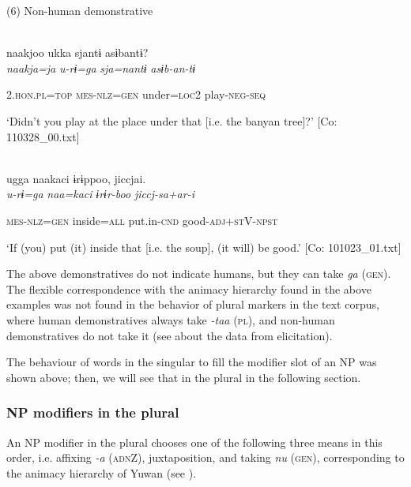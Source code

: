 (6)  Non-human demonstrative

 \ea{}\\
\gll  {\TM}  naakjoo  ukka  sjantɨ  asɨbantɨ?\\

      \textit{naakja=ja}  \textit{u-rɨ=ga}  \textit{sja=nantɨ}  \textit{asɨb-an-tɨ}

      2.\textsc{hon}.\textsc{pl}=\textsc{top}  \textsc{mes}-\textsc{nlz}=\textsc{gen}  under=\textsc{loc}2  play-\textsc{neg}-\textsc{seq}

\glt ‘Didn’t you play at the place under that [i.e. the banyan tree]?’ [Co: 110328\_00.txt]
\z

 \ex{}\\
{\TM}
\gll  ugga  naakaci  ɨrɨppoo,  jiccjai.\\

      \textit{u-rɨ=ga}  \textit{naa=kaci}  \textit{ɨrɨr-boo}  \textit{jiccj-sa+ar-i}

      \textsc{mes}-\textsc{nlz}=\textsc{gen}  inside=\textsc{all}  put.in-\textsc{cnd}  good-\textsc{adj}+\textsc{st}V-\textsc{npst}

\glt ‘If (you) put (it) inside that [i.e. the soup], (it will) be good.’ [Co: 101023\_01.txt]
\z

The above demonstratives do not indicate humans, but they can take \textit{ga} (\textsc{gen}). The flexible correspondence with the animacy hierarchy found in the above examples was not found in the behavior of plural markers in the text corpus, where human demonstratives always take \textit{{}-taa} (\textsc{pl}), and non-human demonstratives do not take it (see  about the data from elicitation).

  The behaviour of words in the singular to fill the modifier slot of an NP was shown above; then, we will see that in the plural in the following section.

\subsubsection{NP modifiers in the plural}

An NP modifier in the plural chooses one of the following three means in this order, i.e. affixing \textit{{}-a} (\textsc{adn}Z), juxtaposition, and taking \textit{nu} (\textsc{gen}), corresponding to the animacy hierarchy of Yuwan (see ).

